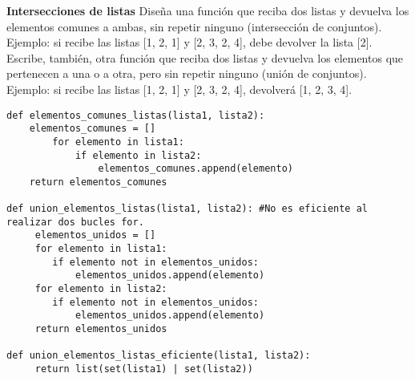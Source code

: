 \documentclass{config/ejercicios}
\begin{document}
\begin{problemS} \textbf{Intersecciones de listas}
Diseña una función que reciba dos listas y devuelva los elementos comunes a ambas, sin repetir ninguno (intersección de conjuntos). Ejemplo: si recibe las listas [1, 2, 1] y [2, 3, 2, 4], debe devolver la lista [2]. Escribe, también, otra función que reciba dos listas y devuelva los elementos que pertenecen a una o a otra, pero sin repetir ninguno (unión de conjuntos). Ejemplo: si recibe las listas [1, 2, 1] y [2, 3, 2, 4], devolverá [1, 2, 3, 4].
\begin{lstlisting}
def elementos_comunes_listas(lista1, lista2):
	elementos_comunes = []
		for elemento in lista1:
			if elemento in lista2:
				elementos_comunes.append(elemento)
	return elementos_comunes
	
def union_elementos_listas(lista1, lista2): #No es eficiente al realizar dos bucles for.
	 elementos_unidos = []
	 for elemento in lista1:
	 	if elemento not in elementos_unidos:
	 		elementos_unidos.append(elemento)
	 for elemento in lista2:
	 	if elemento not in elementos_unidos:
	 		elementos_unidos.append(elemento)
	 return elementos_unidos

def union_elementos_listas_eficiente(lista1, lista2):
	 return list(set(lista1) | set(lista2))
\end{lstlisting}
\end{problemS}
\end{document}

